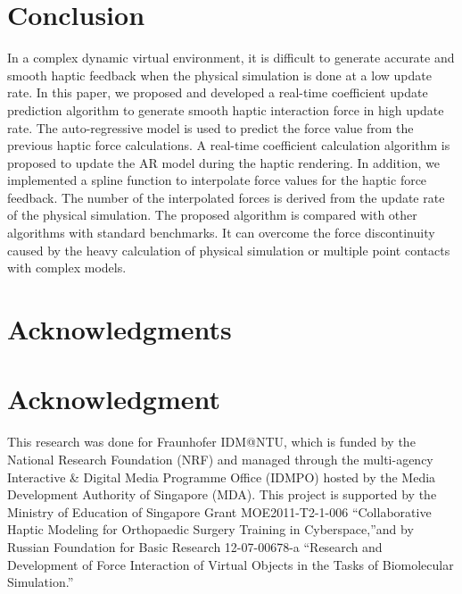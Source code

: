 \documentclass[10pt,journal,cspaper,compsoc]{IEEEtran}
\begin{document}
\section{Conclusion}
\label{sec_6}
In a complex dynamic virtual environment, it is difficult to generate accurate and smooth haptic feedback when the physical simulation is done at a low update rate. In this paper, we proposed and developed a real-time coefficient update prediction algorithm to generate smooth haptic interaction force in high update rate. The auto-regressive model is used to predict the force value from the previous haptic force calculations. A real-time coefficient calculation algorithm is proposed to update the AR model during the haptic rendering. In addition, we implemented a spline function to interpolate force values for the haptic force feedback. The number of the interpolated forces is derived from the update rate of the physical simulation. The proposed algorithm is compared with other algorithms with standard benchmarks. It can overcome the force discontinuity caused by the heavy calculation of physical simulation or multiple point contacts with complex models. 





\ifCLASSOPTIONcompsoc
\section*{Acknowledgments}
\else
\section*{Acknowledgment}
\fi

This research was done for Fraunhofer IDM@NTU, which is funded by the National Research Foundation (NRF) and managed through the multi-agency Interactive \& Digital Media Programme Office (IDMPO) hosted by the Media Development Authority of Singapore (MDA). This project is supported by the Ministry of Education of Singapore Grant MOE2011-T2-1-006 ``Collaborative Haptic Modeling for Orthopaedic Surgery Training in Cyberspace,''and by Russian Foundation for Basic Research 12-07-00678-a ``Research and Development of Force Interaction of Virtual Objects in the Tasks of Biomolecular Simulation.''


\ifCLASSOPTIONcaptionsoff
  \newpage
\fi









\end{document}
